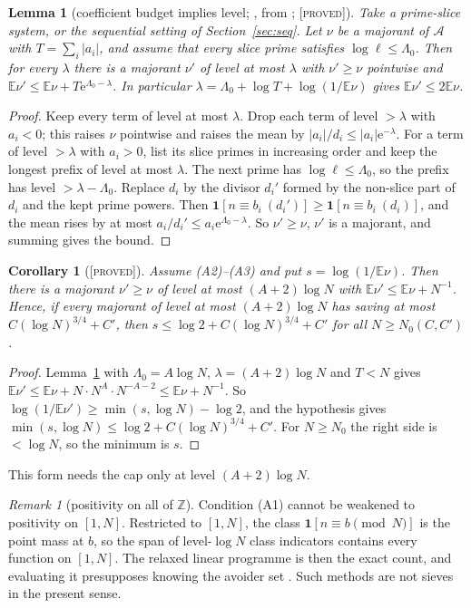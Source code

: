 \documentclass[10pt,reqno]{amsart}
\newtheorem{lemma}[theorem]{Lemma}
\newtheorem{corollary}[theorem]{Corollary}
\theoremstyle{definition}
\theoremstyle{remark}
\newtheorem{remark}[theorem]{Remark}
\newcommand{\A}{\mathcal A}
\newcommand{\E}{\mathbb E}
\newcommand{\Z}{\mathbb Z}
\newcommand{\ind}{\mathbf 1}
\newcommand{\e}{\mathrm e}
\newcommand{\lab}[1]{\textup{[\textsc{#1}]}}
\begin{document}
\begin{lemma}[coefficient budget implies level; {\cite[Lemma~2.9]{ET}}, from {\cite[item~3]{ETrev}}; \lab{proved}]\label{lem:budget}
Take a prime-slice system, or the sequential setting of
Section~\ref{sec:seq}.  Let $\nu$ be a majorant of $\A$ with
$T=\sum_i|a_i|$, and assume that every slice prime satisfies
$\log\ell\leq\Lambda_0$.  Then for every $\lambda$ there is a majorant
$\nu'$ of level at most $\lambda$ with $\nu'\geq\nu$ pointwise and
$\E\nu'\leq\E\nu+T\e^{\Lambda_0-\lambda}$.  In particular
$\lambda=\Lambda_0+\log T+\log(1/\E\nu)$ gives $\E\nu'\leq2\E\nu$.
\end{lemma}
\begin{proof}
Keep every term of level at most $\lambda$.  Drop each term of level
$>\lambda$ with $a_i<0$; this raises $\nu$ pointwise and raises the mean
by $|a_i|/d_i\leq|a_i|\e^{-\lambda}$.  For a term of level $>\lambda$ with
$a_i>0$, list its slice primes in increasing order and keep the longest
prefix of level at most $\lambda$.  The next prime has
$\log\ell\leq\Lambda_0$, so the prefix has level $>\lambda-\Lambda_0$.
Replace $d_i$ by the divisor $d_i'$ formed by the non-slice part of $d_i$
and the kept prime powers.  Then
$\ind[n\equiv b_i\ (d_i')]\geq\ind[n\equiv b_i\ (d_i)]$, and the mean rises
by at most $a_i/d_i'\leq a_i\e^{\Lambda_0-\lambda}$.  So $\nu'\geq\nu$,
$\nu'$ is a majorant, and summing gives the bound.
\end{proof}

\begin{corollary}[\lab{proved}]\label{cor:budgetlevel}
Assume (A2)--(A3) and put $s=\log(1/\E\nu)$.  Then there is a majorant
$\nu'\geq\nu$ of level at most $(A+2)\log N$ with
$\E\nu'\leq\E\nu+N^{-1}$.  Hence, if every majorant of level at most
$(A+2)\log N$ has saving at most $C(\log N)^{3/4}+C'$, then
$s\leq\log2+C(\log N)^{3/4}+C'$ for all $N\geq N_0(C,C')$.
\end{corollary}
\begin{proof}
Lemma~\ref{lem:budget} with $\Lambda_0=A\log N$, $\lambda=(A+2)\log N$ and
$T<N$ gives $\E\nu'\leq\E\nu+N\cdot N^A\cdot N^{-A-2}\leq\E\nu+N^{-1}$.  So
$\log(1/\E\nu')\geq\min(s,\log N)-\log2$, and the hypothesis gives
$\min(s,\log N)\leq\log2+C(\log N)^{3/4}+C'$.  For $N\geq N_0$ the right
side is $<\log N$, so the minimum is $s$.
\end{proof}
This form needs the cap only at level $(A+2)\log N$.

\begin{remark}[positivity on all of $\Z$]\label{rem:positivity}
Condition (A1) cannot be weakened to positivity on $[1,N]$.  Restricted
to $[1,N]$, the class $\ind[n\equiv b\pmod N]$ is the point mass at $b$, so
the span of level-$\log N$ class indicators contains every function on
$[1,N]$.  The relaxed linear programme is then the exact count, and
evaluating it presupposes knowing the avoider set
\cite[\S2.4]{ET}.  Such methods are not sieves in the present sense.
\end{remark}
\end{document}
